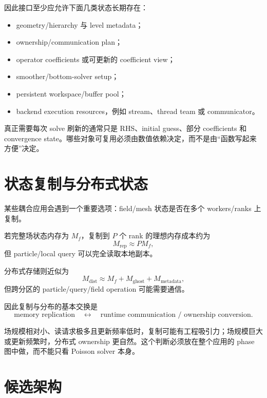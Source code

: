 因此接口至少应允许下面几类状态长期存在：

\begin{itemize}
\item geometry/hierarchy 与 level metadata；
\item ownership/communication plan；
\item operator coefficients 或可更新的 coefficient view；
\item smoother/bottom-solver setup；
\item persistent workspace/buffer pool；
\item backend execution resources，例如 stream、thread team 或 communicator。
\end{itemize}

真正需要每次 solve 刷新的通常只是 RHS、initial guess、部分 coefficients 和 convergence state。哪些对象可复用必须由数值依赖决定，而不是由“函数写起来方便”决定。

\section{状态复制与分布式状态}

某些耦合应用会遇到一个重要选项：field/mesh 状态是否在多个 workers/ranks 上复制。

若完整场状态内存为 $M_f$，复制到 $P$ 个 rank 的理想内存成本约为
\begin{equation}
M_{\mathrm{rep}}
\approx
P M_f,
\end{equation}
但 particle/local query 可以完全读取本地副本。

分布式存储则近似为
\begin{equation}
M_{\mathrm{dist}}
\approx
M_f
+
M_{\mathrm{ghost}}
+
M_{\mathrm{metadata}},
\end{equation}
但跨分区的 particle/query/field operation 可能需要通信。

因此复制与分布的基本交换是
\begin{equation}
\boxed{
\text{memory replication}
\quad\leftrightarrow\quad
\text{runtime communication / ownership conversion}.
}
\label{eq:architecture-replicate-distribute}
\end{equation}

场规模相对小、读请求极多且更新频率低时，复制可能有工程吸引力；场规模巨大或更新频繁时，分布式 ownership 更自然。这个判断必须放在整个应用的 phase 图中做，而不能只看 Poisson solver 本身。

\section{候选架构}


